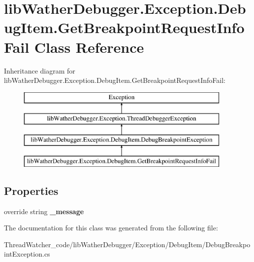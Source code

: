 \hypertarget{classlib_wather_debugger_1_1_exception_1_1_debug_item_1_1_get_breakpoint_request_info_fail}{\section{lib\+Wather\+Debugger.\+Exception.\+Debug\+Item.\+Get\+Breakpoint\+Request\+Info\+Fail Class Reference}
\label{classlib_wather_debugger_1_1_exception_1_1_debug_item_1_1_get_breakpoint_request_info_fail}
}
Inheritance diagram for lib\+Wather\+Debugger.\+Exception.\+Debug\+Item.\+Get\+Breakpoint\+Request\+Info\+Fail\+:\begin{figure}[H]
\begin{center}
\leavevmode
\includegraphics[height=4.000000cm]{classlib_wather_debugger_1_1_exception_1_1_debug_item_1_1_get_breakpoint_request_info_fail}
\end{center}
\end{figure}
\subsection*{Properties}
\begin{DoxyCompactItemize}
\item 
\hypertarget{classlib_wather_debugger_1_1_exception_1_1_debug_item_1_1_get_breakpoint_request_info_fail_aa7cc5f97e507c06868c0b0c7f6aa5b8b}{override string {\bfseries \+\_\+message}}\label{classlib_wather_debugger_1_1_exception_1_1_debug_item_1_1_get_breakpoint_request_info_fail_aa7cc5f97e507c06868c0b0c7f6aa5b8b}

\end{DoxyCompactItemize}


The documentation for this class was generated from the following file\+:\begin{DoxyCompactItemize}
\item 
Thread\+Watcher\+\_\+code/lib\+Wather\+Debugger/\+Exception/\+Debug\+Item/Debug\+Breakpoint\+Exception.\+cs\end{DoxyCompactItemize}
